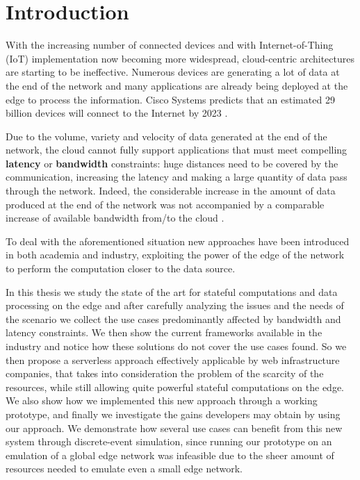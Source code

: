 \section{Introduction}
\label{sec:introduction}

With the increasing number of connected devices and with Internet-of-Thing (IoT) implementation now becoming more widespread, cloud-centric architectures are starting to be ineffective. Numerous devices are generating a lot of data at the end of the network and many applications are already being deployed at the edge to process the information.
Cisco Systems predicts that an estimated 29 billion devices will connect to the Internet by 2023 \cite{cisco2018-2023}.

Due to the volume, variety and velocity of data generated at the end of the network, the cloud cannot fully support applications that must meet compelling \textbf{latency} or \textbf{bandwidth} constraints: huge distances need to be covered by the communication, increasing the latency and making a large quantity of data pass through the network.
Indeed, the considerable increase in the amount of data produced at the end of the network was not accompanied by a comparable increase of available bandwidth from/to the cloud \cite{promise-of-edge-computing}.

To deal with the aforementioned situation new approaches have been introduced in both academia and industry, exploiting the power of the edge of the network to perform the computation closer to the data source.

In this thesis we study the state of the art for stateful computations and data processing on the edge and after carefully analyzing the issues and the needs of the scenario we collect the use cases predominantly affected by bandwidth and latency constraints. We then show the current frameworks available in the industry and notice how these solutions do not cover the use cases found. So we then propose a serverless approach effectively applicable by web infrastructure companies, that takes into consideration the problem of the scarcity of the resources, while still allowing quite powerful stateful computations on the edge. We also show how we implemented this new approach through a working prototype, and finally we investigate the gains developers may obtain by using our approach. We demonstrate how several use cases can benefit from this new system through discrete-event simulation, since running our prototype on an emulation of a global edge network was infeasible due to the sheer amount of resources needed to emulate even a small edge network.



